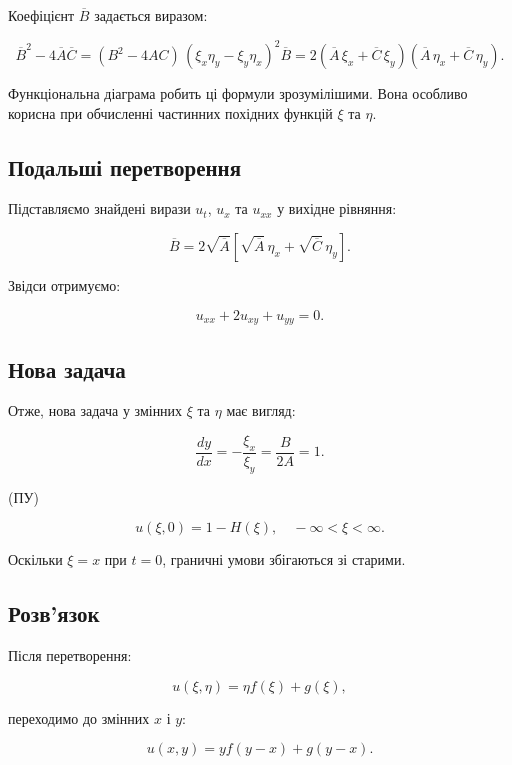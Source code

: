 \documentclass[
  ukrainian,
]{article}
\begin{document}
Коефіцієнт \(\overline{B}\) задається виразом:

\[
\overline{B}^2 - 4\overline{A}\overline{C} = (B^2 - 4AC)\,(\xi_x \eta_y - \xi_y \eta_x)^2
\overline{B} = 2\left( \overline{A}\,\xi_x + \overline{C}\,\xi_y \right)
\left( \overline{A}\,\eta_x + \overline{C}\,\eta_y \right).
\]

Функціональна діаграма робить ці формули зрозумілішими. Вона особливо
корисна при обчисленні частинних похідних функцій \(\xi\) та \(\eta\).

\subsection{Подальші
перетворення}\label{ux43fux43eux434ux430ux43bux44cux448ux456-ux43fux435ux440ux435ux442ux432ux43eux440ux435ux43dux43dux44f}

Підставляємо знайдені вирази \(u_t\), \(u_x\) та \(u_{xx}\) у вихідне
рівняння:

\[
\overline{B} = 2\sqrt{\overline{A}} \left[ \sqrt{\overline{A}}\, \eta_x + \sqrt{\overline{C}}\, \eta_y \right].
\]

Звідси отримуємо:

\[
u_{xx} + 2u_{xy} + u_{yy} = 0.
\]

\subsection{Нова
задача}\label{ux43dux43eux432ux430-ux437ux430ux434ux430ux447ux430}

Отже, нова задача у змінних \(\xi\) та \(\eta\) має вигляд:

\[
\frac{dy}{dx} = -\frac{\xi_x}{\xi_y} = \frac{B}{2A} = 1.
\]

(ПУ)

\[
u(\xi, 0) = 1 - H(\xi), \quad -\infty < \xi < \infty.
\]

Оскільки \(\xi = x\) при \(t = 0\), граничні умови збігаються зі
старими.

\subsection{Розв'язок}\label{ux440ux43eux437ux432ux44fux437ux43eux43a}

Після перетворення:

\[
u(\xi, \eta) = \eta f(\xi) + g(\xi),
\]

переходимо до змінних \(x\) і \(y\):

\[
u(x, y) = y f(y - x) + g(y - x).
\]
\end{document}
